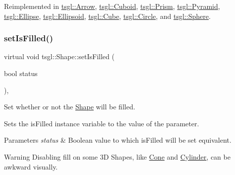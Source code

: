 Reimplemented in \hyperlink{classtsgl_1_1_arrow_a7804a81f8ae4ae0208e80849438364f0}{tsgl\+::\+Arrow}, \hyperlink{classtsgl_1_1_cuboid_aab8a70aff0dcede030ac51277c0dc255}{tsgl\+::\+Cuboid}, \hyperlink{classtsgl_1_1_prism_a668c2779da173493efc0c4634750bd66}{tsgl\+::\+Prism}, \hyperlink{classtsgl_1_1_pyramid_a83799687df3bdef698f9687da7a6c100}{tsgl\+::\+Pyramid}, \hyperlink{classtsgl_1_1_ellipse_a052ef5a609d7e8516d973ddc9e549c89}{tsgl\+::\+Ellipse}, \hyperlink{classtsgl_1_1_ellipsoid_ab8e15e879521e4c96be8192258cad26e}{tsgl\+::\+Ellipsoid}, \hyperlink{classtsgl_1_1_cube_a28111319d350040165bd24d92342c7cc}{tsgl\+::\+Cube}, \hyperlink{classtsgl_1_1_circle_aa25c336d07fb8216bd5d6f63f53a2271}{tsgl\+::\+Circle}, and \hyperlink{classtsgl_1_1_sphere_aab902ab87c24e7065c74f553f7e8c126}{tsgl\+::\+Sphere}.

\mbox{\label{classtsgl_1_1_shape_acf10e14a8b26ced8926fcdeaf42e8728}} 
\subsubsection{\texorpdfstring{set\+Is\+Filled()}{setIsFilled()}}
{\footnotesize\ttfamily virtual void tsgl\+::\+Shape\+::set\+Is\+Filled (\begin{DoxyParamCaption}\item[{bool}]{status }\end{DoxyParamCaption})\hspace{0.3cm}{\ttfamily [inline]}, {\ttfamily [virtual]}}



Set whether or not the \hyperlink{classtsgl_1_1_shape}{Shape} will be filled. 

Sets the is\+Filled instance variable to the value of the parameter. 
\begin{DoxyParams}{Parameters}
{\em status} & Boolean value to which is\+Filled will be set equivalent. \\
\hline
\end{DoxyParams}
\begin{DoxyWarning}{Warning}
Disabling fill on some 3D Shapes, like \hyperlink{classtsgl_1_1_cone}{Cone} and \hyperlink{classtsgl_1_1_cylinder}{Cylinder}, can be awkward visually. 
\end{DoxyWarning}
\mbox{\label{classtsgl_1_1_shape_afedf4a424c24ed38c389f09cd5ecf451}} 
